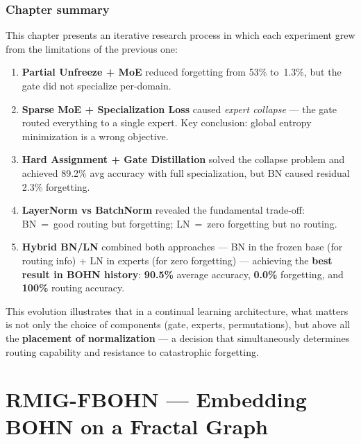 \documentclass[11pt,a4paper]{report}
\begin{document}


\subsection*{Chapter summary}

This chapter presents an iterative research process in which each experiment grew from the limitations of the previous one:

\begin{enumerate}
    \item \textbf{Partial Unfreeze + MoE} reduced forgetting from 53\% to~1.3\%, but the gate did not specialize per-domain.
    \item \textbf{Sparse MoE + Specialization Loss} caused \emph{expert collapse} --- the gate routed everything to a single expert. Key conclusion: global entropy minimization is a wrong objective.
    \item \textbf{Hard Assignment + Gate Distillation} solved the collapse problem and achieved 89.2\% avg accuracy with full specialization, but BN caused residual 2.3\% forgetting.
    \item \textbf{LayerNorm vs BatchNorm} revealed the fundamental trade-off: BN~=~good routing but forgetting; LN~=~zero forgetting but no routing.
    \item \textbf{Hybrid BN/LN} combined both approaches --- BN in the frozen base (for routing info) + LN in experts (for zero forgetting) --- achieving the \textbf{best result in BOHN history}: \textbf{90.5\%} average accuracy, \textbf{0.0\%} forgetting, and \textbf{100\%} routing accuracy.
\end{enumerate}

This evolution illustrates that in a continual learning architecture, what matters is not only the choice of components (gate, experts, permutations), but above all the \textbf{placement of normalization} --- a decision that simultaneously determines routing capability and resistance to catastrophic forgetting.





\chapter{RMIG-FBOHN --- Embedding BOHN on a Fractal Graph}
\label{ch:rmig_fbohn}
\end{document}
